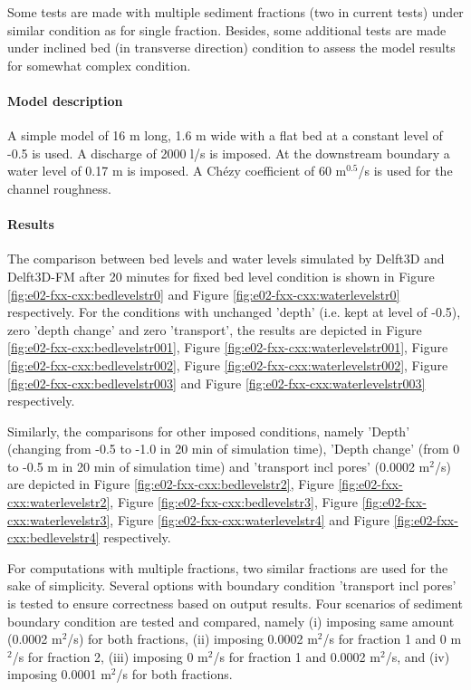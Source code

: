 Some tests are made with multiple sediment fractions (two in current tests) under similar condition as for single fraction. Besides, some additional tests are made under inclined bed (in transverse direction) condition to assess the model results for somewhat complex condition.    

\paragraph*{Model description}
A simple model of 16 m long, 1.6 m wide with a flat bed at a constant level of -0.5 is used. A discharge of 2000 l/s is imposed.  At the downstream boundary a water level of 0.17 m is imposed. A Ch\'ezy coefficient of 60 m$^0.5$/s is used for the channel roughness.   

\paragraph*{Results}
The comparison between bed levels and water levels simulated by Delft3D and Delft3D-FM after 20 minutes for fixed bed level condition is shown in Figure \ref{fig:e02-fxx-cxx:bedlevelstr0} and Figure \ref{fig:e02-fxx-cxx:waterlevelstr0} respectively. For the conditions with unchanged 'depth' (i.e. kept at level of -0.5), zero 'depth change' and zero 'transport', the results are depicted in Figure \ref{fig:e02-fxx-cxx:bedlevelstr001}, Figure \ref{fig:e02-fxx-cxx:waterlevelstr001}, Figure \ref{fig:e02-fxx-cxx:bedlevelstr002}, Figure \ref{fig:e02-fxx-cxx:waterlevelstr002}, Figure \ref{fig:e02-fxx-cxx:bedlevelstr003} and Figure \ref{fig:e02-fxx-cxx:waterlevelstr003} respectively.   

Similarly, the comparisons for other imposed conditions, namely 'Depth' (changing from -0.5 to -1.0 in 20 min of simulation time), 'Depth change' (from 0 to -0.5 m in 20 min of simulation time) and 'transport incl pores' (0.0002 m$^2$/s) are depicted in Figure \ref{fig:e02-fxx-cxx:bedlevelstr2}, Figure \ref{fig:e02-fxx-cxx:waterlevelstr2}, Figure \ref{fig:e02-fxx-cxx:bedlevelstr3}, Figure \ref{fig:e02-fxx-cxx:waterlevelstr3}, Figure \ref{fig:e02-fxx-cxx:waterlevelstr4} and Figure \ref{fig:e02-fxx-cxx:bedlevelstr4} respectively. 

For computations with multiple fractions, two similar fractions are used for the sake of simplicity. Several options with boundary condition 'transport incl pores' is tested to ensure correctness based on output results. Four scenarios of sediment boundary condition are tested and compared, namely (i) imposing same amount (0.0002 m$^2$/s) for both fractions, (ii) imposing 0.0002 m$^2$/s for fraction 1 and 0 m$^2$/s for fraction 2, (iii) imposing 0 m$^2$/s for fraction 1 and 0.0002 m$^2$/s, and (iv) imposing 0.0001 m$^2$/s for both fractions. 

